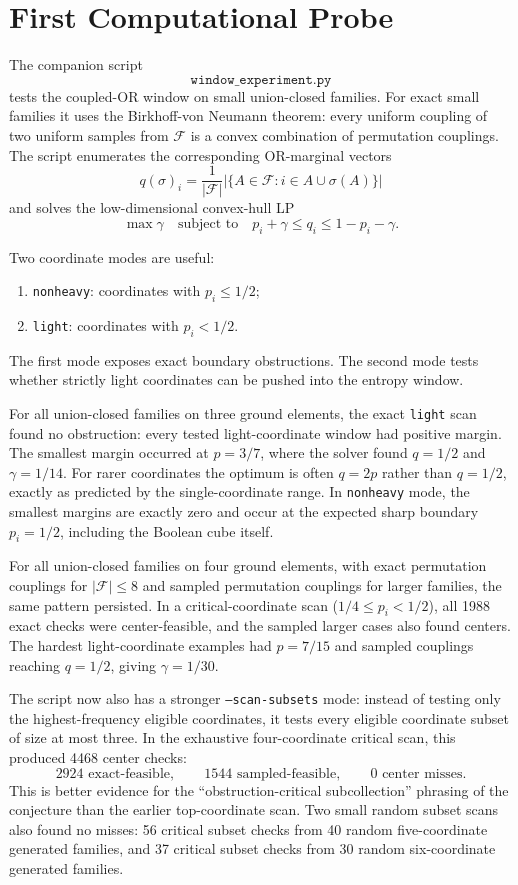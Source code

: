 \documentclass[11pt]{article}
\begin{document}
\section{First Computational Probe}

The companion script
\[
  \texttt{window\_experiment.py}
\]
tests the coupled-OR window on small union-closed families.  For exact small
families it uses the Birkhoff-von Neumann theorem: every uniform coupling of
two uniform samples from $\mathcal{F}$ is a convex combination of permutation
couplings.  The script enumerates the corresponding OR-marginal vectors
\[
  q(\sigma)_i
  =
  \frac{1}{|\mathcal{F}|}
  \left|\{A\in\mathcal{F}: i\in A\cup\sigma(A)\}\right|
\]
and solves the low-dimensional convex-hull LP
\[
  \max \gamma
  \quad\text{subject to}\quad
  p_i+\gamma\le q_i\le 1-p_i-\gamma.
\]

Two coordinate modes are useful:
\begin{enumerate}
  \item \texttt{nonheavy}: coordinates with $p_i\le 1/2$;
  \item \texttt{light}: coordinates with $p_i<1/2$.
\end{enumerate}
The first mode exposes exact boundary obstructions.  The second mode tests
whether strictly light coordinates can be pushed into the entropy window.

For all union-closed families on three ground elements, the exact
\texttt{light} scan found no obstruction: every tested light-coordinate window
had positive margin.  The smallest margin occurred at $p=3/7$, where the
solver found $q=1/2$ and $\gamma=1/14$.  For rarer coordinates the optimum is
often $q=2p$ rather than $q=1/2$, exactly as predicted by the
single-coordinate range.  In \texttt{nonheavy} mode, the smallest margins are
exactly zero and occur at the expected sharp boundary $p_i=1/2$, including the
Boolean cube itself.

For all union-closed families on four ground elements, with exact permutation
couplings for $|\mathcal{F}|\le 8$ and sampled permutation couplings for larger
families, the same pattern persisted.  In a critical-coordinate scan
($1/4\le p_i<1/2$), all 1988 exact checks were center-feasible, and the sampled
larger cases also found centers.  The hardest light-coordinate examples had
$p=7/15$ and sampled couplings reaching $q=1/2$, giving $\gamma=1/30$.

The script now also has a stronger \texttt{--scan-subsets} mode: instead of
testing only the highest-frequency eligible coordinates, it tests every
eligible coordinate subset of size at most three.  In the exhaustive
four-coordinate critical scan, this produced 4468 center checks:
\[
  2924\text{ exact-feasible},\qquad
  1544\text{ sampled-feasible},\qquad
  0\text{ center misses}.
\]
This is better evidence for the ``obstruction-critical subcollection''
phrasing of the conjecture than the earlier top-coordinate scan.  Two small
random subset scans also found no misses: 56 critical subset checks from 40
random five-coordinate generated families, and 37 critical subset checks from
30 random six-coordinate generated families.
\end{document}
